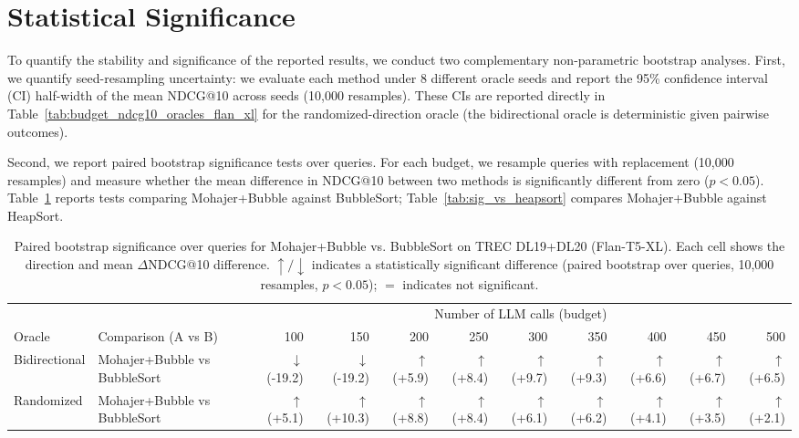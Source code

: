 \documentclass{llmxive}
\providecommand{\thetable}{A.\arabic{table}}
\begin{document}
\section{Statistical Significance}
\label{sec:significance}
\renewcommand{\thetable}{A.\arabic{table}}  %

To quantify the stability and significance of the reported results, we conduct two complementary non-parametric bootstrap analyses. First, we quantify seed-resampling uncertainty: we evaluate each method under 8 different oracle seeds and report the 95\% confidence interval (CI) half-width of the mean NDCG@10 across seeds (10,000 resamples). These CIs are reported directly in Table~\ref{tab:budget_ndcg10_oracles_flan_xl} for the randomized-direction oracle (the bidirectional oracle is deterministic given pairwise outcomes). 

Second, we report paired bootstrap significance tests over queries. For each budget, we resample queries with replacement (10,000 resamples) and measure whether the mean difference in NDCG@10 between two methods is significantly different from zero ($p < 0.05$). Table~\ref{tab:sig_vs_bubble} reports tests comparing Mohajer+Bubble against BubbleSort; Table~\ref{tab:sig_vs_heapsort} compares Mohajer+Bubble against HeapSort.

\begin{table}[!htbp]
\centering
\scriptsize
\begin{adjustbox}{max width=\linewidth}
\begin{tabular}{llrrrrrrrrr}
\toprule
& & \multicolumn{9}{c}{Number of LLM calls (budget)} \\
\cmidrule(lr){3-11}
Oracle & Comparison (A vs B) & 100 & 150 & 200 & 250 & 300 & 350 & 400 & 450 & 500 \\
\midrule
Bidirectional & Mohajer+Bubble vs BubbleSort     & $\downarrow$ (-19.2) & $\downarrow$ (-19.2) & $\uparrow$ (+5.9) & $\uparrow$ (+8.4) & $\uparrow$ (+9.7) & $\uparrow$ (+9.3) & $\uparrow$ (+6.6) & $\uparrow$ (+6.7) & $\uparrow$ (+6.5) \\
Randomized    & Mohajer+Bubble vs BubbleSort     & $\uparrow$ (+5.1) & $\uparrow$ (+10.3) & $\uparrow$ (+8.8) & $\uparrow$ (+8.4) & $\uparrow$ (+6.1) & $\uparrow$ (+6.2) & $\uparrow$ (+4.1) & $\uparrow$ (+3.5) & $\uparrow$ (+2.1) \\
\bottomrule
\end{tabular}
\end{adjustbox}
\caption{Paired bootstrap significance over queries for Mohajer+Bubble vs. BubbleSort on TREC DL19+DL20 (Flan-T5-XL). Each cell shows the direction and mean $\Delta$NDCG@10 difference. $\uparrow/\downarrow$ indicates a statistically significant difference (paired bootstrap over queries, 10,000 resamples, $p < 0.05$); $=$ indicates not significant.}
\label{tab:sig_vs_bubble}
\end{table}
\end{document}
